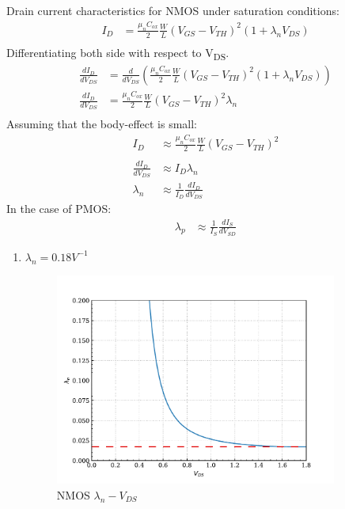 \documentclass{article}
\begin{document}
\begin{enumerate}
Drain current characteristics for NMOS under saturation conditions:
\begin{equation*}
\begin{aligned}
I_{D} &= \frac{\mu_{n}C_{ox}}{2} \frac{W}{L} (V_{GS} - V_{TH})^2(1 + \lambda_{n}V_{DS}) \\
\end{aligned}
\end{equation*}
Differentiating both side with respect to V\textsubscript{DS}.
\begin{equation*}
\begin{aligned}
\frac{dI_{D}}{dV_{DS}} &= \frac{d}{dV_{DS}} (\frac{\mu_{n}C_{ox}}{2} \frac{W}{L} (V_{GS} - V_{TH})^2(1 + \lambda_{n} V_{DS})) \\
\frac{dI_{D}}{dV_{DS}} &= \frac{\mu_{n}C_{ox}}{2} \frac{W}{L} (V_{GS} - V_{TH})^2 \lambda_{n} \\
\end{aligned}
\end{equation*}
Assuming that the body-effect is small:
\begin{equation*}
\begin{aligned}
I_{D} &\approx \frac{\mu_{n}C_{ox}}{2} \frac{W}{L} (V_{GS} - V_{TH})^2 \\
\\
\frac{dI_{D}}{dV_{DS}} &\approx I_{D} \lambda_{n} \\
\lambda_{n} &\approx \frac{1}{I_{D}} \frac{dI_{D}}{dV_{DS}}
\end{aligned}
\end{equation*}
In the case of PMOS:
\begin{equation*}
\begin{aligned}
\lambda_{p} &\approx \frac{1}{I_{S}} \frac{dI_{S}}{dV_{SD}}
\end{aligned}
\end{equation*}

\begin{enumerate}
\item \(\lambda_{n} = 0.18 V^{-1}\)
\begin{figure}[H]
\centering
\includegraphics[width=350px]{img/q4/b/nmos-d-id-id.pdf}
\caption{\label{fig:nmos-d-id-id}NMOS \(\lambda_{n}-V_{DS}\)}
\end{figure}


\end{enumerate}
\end{enumerate}
\end{document}
